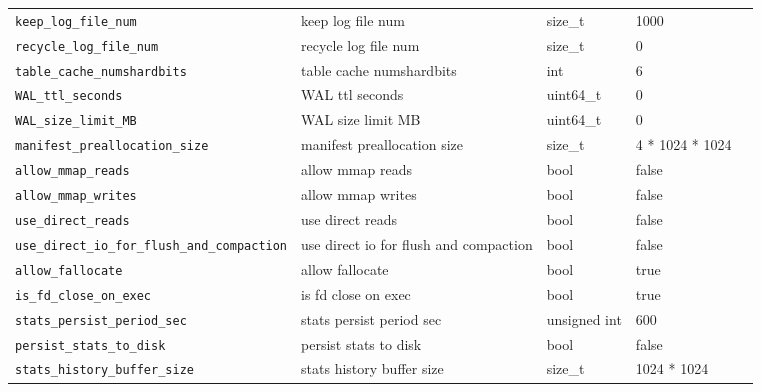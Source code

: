 {{\begin{longtable}{@{}p{3.4cm}p{5.0cm}p{3.6cm}p{2.5cm}p{2.6cm}@{}}
    \texttt{keep\_log\_file\_num}
    & keep log file num
    & size\_t
    & 1000
    & \\

    \texttt{recycle\_log\_file\_num}
    & recycle log file num
    & size\_t
    & 0
    & \\

    \texttt{table\_cache\_numshardbits}
    & table cache numshardbits
    & int
    & 6
    & \\

    \texttt{WAL\_ttl\_seconds}
    & WAL ttl seconds
    & uint64\_t
    & 0
    & \\

    \texttt{WAL\_size\_limit\_MB}
    & WAL size limit MB
    & uint64\_t
    & 0
    & \\

    \texttt{manifest\_preallocation\_size}
    & manifest preallocation size
    & size\_t
    & 4 * 1024 * 1024
    & \\

    \texttt{allow\_mmap\_reads}
    & allow mmap reads
    & bool
    & false
    & \\

    \texttt{allow\_mmap\_writes}
    & allow mmap writes
    & bool
    & false
    & \\

    \texttt{use\_direct\_reads}
    & use direct reads
    & bool
    & false
    & \\

    \texttt{use\_direct\_io\_for\_flush\_and\_compaction}
    & use direct io for flush and compaction
    & bool
    & false
    & \\

    \texttt{allow\_fallocate}
    & allow fallocate
    & bool
    & true
    & \\

    \texttt{is\_fd\_close\_on\_exec}
    & is fd close on exec
    & bool
    & true
    & \\

    \texttt{stats\_persist\_period\_sec}
    & stats persist period sec
    & unsigned int
    & 600
    & \\

    \texttt{persist\_stats\_to\_disk}
    & persist stats to disk
    & bool
    & false
    & \\

    \texttt{stats\_history\_buffer\_size}
    & stats history buffer size
    & size\_t
    & 1024 * 1024
    & \\


\end{longtable}}}
